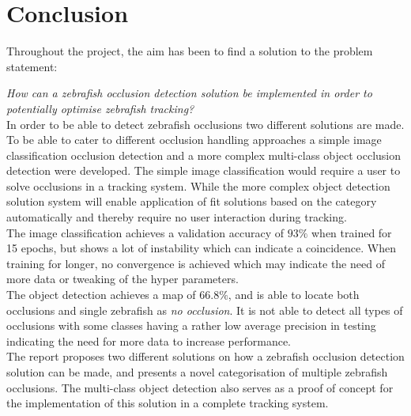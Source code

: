 \chapter{Conclusion}\label{ch:conclusion}\glsresetall
Throughout the project, the aim has been to find a solution to the problem statement:

\textit{How can a zebrafish occlusion detection solution be implemented in order to potentially optimise zebrafish tracking?}\\

In order to be able to detect zebrafish occlusions two different solutions are made. To be able to cater to different occlusion handling approaches a simple image classification occlusion detection and a more complex multi-class object occlusion detection were developed. The simple image classification would require a user to solve occlusions in a tracking system. While the more complex object detection solution system will enable application of fit solutions based on the category automatically and thereby require no user interaction during tracking.\\

The image classification achieves a validation accuracy of $93\%$ when trained for 15 epochs, but shows a lot of instability which can indicate a coincidence. When training for longer, no convergence is achieved which may indicate the need of more data or tweaking of the hyper parameters.\\

The object detection achieves a \gls{map} of $66.8\%$, and is able to locate both occlusions and single zebrafish as \textit{no occlusion}. It is not able to detect all types of occlusions with some classes having a rather low average precision in testing indicating the need for more data to increase performance.\\

The report proposes two different solutions on how a zebrafish occlusion detection solution can be made, and presents a novel categorisation of multiple zebrafish occlusions. The multi-class object detection also serves as a proof of concept for the implementation of this solution in a complete tracking system.